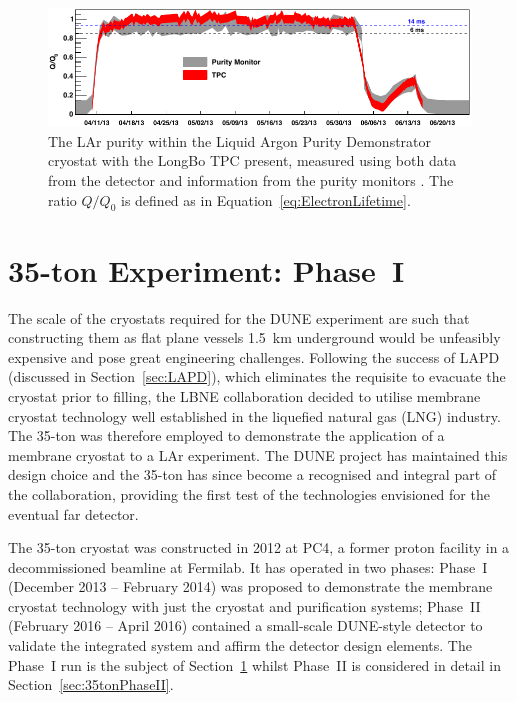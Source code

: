 \begin{figure}
  \centering
  \includegraphics[width=14cm]{LongBoPurity.pdf}
  \caption[The LAr purity within the Liquid Argon Purity Demonstrator cryostat with the LongBo TPC present, measured using both data from the detector and information from the purity monitors.]{The LAr purity within the Liquid Argon Purity Demonstrator cryostat with the LongBo TPC present, measured using both data from the detector and information from the purity monitors \cite{LongBo2015}.  The ratio $Q/Q_0$ is defined as in Equation~\ref{eq:ElectronLifetime}.}
  \label{fig:LongBoPurity}
\end{figure}

\section{35-ton Experiment: Phase~I}\label{sec:35tonPhaseI}

The scale of the cryostats required for the DUNE experiment are such that constructing them as flat plane vessels 1.5~km underground would be unfeasibly expensive and pose great engineering challenges.  Following the success of LAPD (discussed in Section~\ref{sec:LAPD}), which eliminates the requisite to evacuate the cryostat prior to filling, the LBNE collaboration decided to utilise membrane cryostat technology well established in the liquefied natural gas (LNG) industry.  The 35-ton \cite{35tonPhaseI2014,35tonPhaseI2014Cryostat,35tonPhaseI2015} was therefore employed to demonstrate the application of a membrane cryostat to a LAr experiment.  The DUNE project has maintained this design choice and the 35-ton has since become a recognised and integral part of the collaboration, providing the first test of the technologies envisioned for the eventual far detector.

The 35-ton cryostat was constructed in 2012 at PC4, a former proton facility in a decommissioned beamline at Fermilab.  It has operated in two phases: Phase~I (December 2013 -- February 2014) was proposed to demonstrate the membrane cryostat technology with just the cryostat and purification systems; Phase~II (February 2016 -- April 2016) contained a small-scale DUNE-style detector to validate the integrated system and affirm the detector design elements.  The Phase~I run is the subject of Section~\ref{sec:35tonPhaseI} whilst Phase~II is considered in detail in Section~\ref{sec:35tonPhaseII}.

